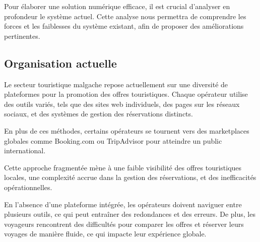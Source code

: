 \documentclass[12pt]{report}
\begin{document}
				\hspace{15pt} Pour élaborer une solution numérique efficace, il est crucial d'analyser en profondeur le système actuel. Cette analyse nous permettra de comprendre les forces et les faiblesses du système existant, afin de proposer des améliorations pertinentes.

				\subsection{Organisation actuelle}
				
				\hspace{15pt} Le secteur touristique malgache repose actuellement sur une diversité de plateformes pour la promotion des offres touristiques. Chaque opérateur utilise des outils variés, tels que des sites web individuels, des pages sur les réseaux sociaux, et des systèmes de gestion des réservations distincts. 

				En plus de ces méthodes, certains opérateurs se tournent vers des marketplaces globales comme Booking.com ou TripAdvisor pour atteindre un public international.

				 Cette approche fragmentée mène à une faible visibilité des offres touristiques locales, une complexité accrue dans la gestion des réservations, et des inefficacités opérationnelles.

				En l'absence d'une plateforme intégrée, les opérateurs doivent naviguer entre plusieurs outils, ce qui peut entraîner des redondances et des erreurs. De plus, les voyageurs rencontrent des difficultés pour comparer les offres et réserver leurs voyages de manière fluide, ce qui impacte leur expérience globale.
\end{document}
